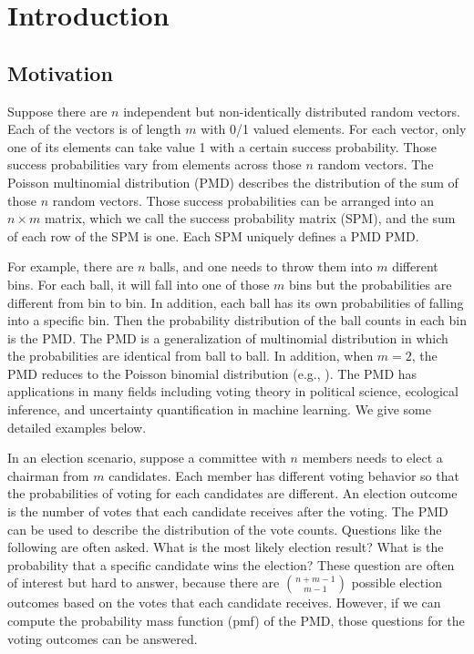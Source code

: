 \documentclass[12pt]{article}
\newcommand{\PMD}{\textrm{PMD}}
\begin{document}
\newpage
\section{Introduction}
\subsection{Motivation}

Suppose there are $n$ independent but non-identically distributed random vectors. Each of the vectors is of length $m$ with 0/1 valued elements. For each vector, only one of its elements can take value 1 with a certain success probability. Those success probabilities vary from elements across those $n$ random vectors. The Poisson multinomial distribution (PMD) describes the distribution of the sum of those $n$ random vectors. Those success probabilities can be arranged into an $n \times m$ matrix, which we call the success probability matrix (SPM), and the sum of each row of the SPM is one. Each SPM uniquely defines a PMD $\PMD$.

For example, there are $n$ balls, and one needs to throw them into $m$ different bins. For each ball, it will fall into one of those $m$ bins but the probabilities are different from bin to bin. In addition, each ball has its own probabilities of falling into a specific bin. Then the probability distribution of the ball counts in each bin is the $\PMD$. The $\PMD$ is a generalization of multinomial distribution in which the probabilities are identical from ball to ball. In addition, when $m=2$, the $\PMD$ reduces to the Poisson binomial distribution (e.g., ). The $\PMD$ has applications in many fields including voting theory in political science, ecological inference, and uncertainty quantification in machine learning. We give some detailed examples below.

In an election scenario, suppose a committee with $n$ members needs to elect a chairman from $m$ candidates. Each member has different voting behavior so that the probabilities of voting for each candidates are different. An election outcome is the number of votes that each candidate receives after the voting. The $\PMD$ can be used to describe the distribution of the vote counts. Questions like the following are often asked. What is the most likely election result? What is the probability that a specific candidate wins the election? These question are often of interest but hard to answer, because there are $\binom{n+m-1}{m-1}$ possible election outcomes based on the votes that each candidate receives. However, if we can compute the probability mass function (pmf) of the $\PMD$, those questions for the voting outcomes can be answered.
\end{document}
